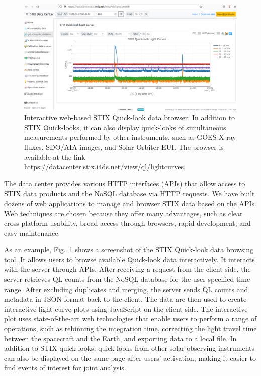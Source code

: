 \documentclass[referee]{aa} %
\begin{document}
\begin{figure}[ht]
  \centering
  \includegraphics[width=0.7\linewidth]{figures/data-browser.pdf}
  \caption{ 
    Interactive web-based STIX Quick-look data browser. 
    In addition to STIX Quick-looks, it can also display quick-looks of simultaneous measurements 
    performed by other instruments, such as GOES X-ray fluxes, SDO/AIA images, and Solar Orbiter EUI. 
    The browser is available at the link \url{https://datacenter.stix.i4ds.net/view/ql/lightcurves}.}
  \label{fig:qlbrowser}
\end{figure}
The data center provides various HTTP interfaces (APIs) that allow access to STIX data products
and the NoSQL database via HTTP requests. 
We have built dozens of web applications to manage and browser STIX data based on the APIs. 
Web techniques are chosen because they offer many advantages, such as clear cross-platform 
usability, broad access through browsers, rapid development, and easy maintenance.

As an example, Fig.~\ref{fig:qlbrowser} shows a screenshot of the STIX Quick-look data browsing 
tool. It allows users to browse available Quick-look data interactively. It 
interacts with the server through APIs. 
After receiving a request from the client side,
the server retrieves QL counts from the NoSQL database for the user-specified time range. 
After excluding duplicates and merging,  the server sends QL counts and metadata in JSON format back to the client. The data are then used to create interactive light curve plots using JavaScript on the client side. 
The interactive plot uses state-of-the-art web technologies that enable users to perform a range of operations, such as rebinning the integration time, correcting the light travel time between the spacecraft and the Earth, and exporting data to a local file. In addition to STIX quick-looks, quick-looks from other solar-observing instruments can also be displayed on the same page after users' activation, 
making it easier to find events of interest for joint analysis.
\end{document}
